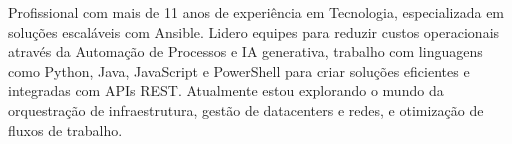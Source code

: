 

\begin{cvparagraph}

Profissional com mais de 11 anos de experiência em Tecnologia, especializada em soluções escaláveis com Ansible. Lidero equipes para reduzir custos operacionais através da Automação de Processos e IA generativa, trabalho com linguagens como Python, Java, JavaScript e PowerShell para criar soluções eficientes e integradas com APIs REST. Atualmente estou explorando o mundo da orquestração de infraestrutura, gestão de datacenters e redes, e otimização de fluxos de trabalho.
\end{cvparagraph}
